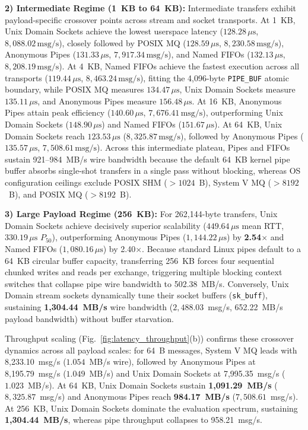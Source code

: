 \textbf{2) Intermediate Regime (1~KB to 64~KB):} Intermediate transfers exhibit payload-specific crossover points across stream and socket transports. At 1~KB, Unix Domain Sockets achieve the lowest userspace latency ($128.28\,\mu\text{s}$, $8,088.02\,\text{msg/s}$), closely followed by POSIX MQ ($128.59\,\mu\text{s}$, $8,230.58\,\text{msg/s}$), Anonymous Pipes ($131.33\,\mu\text{s}$, $7,917.34\,\text{msg/s}$), and Named FIFOs ($132.13\,\mu\text{s}$, $8,208.19\,\text{msg/s}$). At 4~KB, Named FIFOs achieve the fastest execution across all transports ($119.44\,\mu\text{s}$, $8,463.24\,\text{msg/s}$), fitting the 4,096-byte \texttt{PIPE\_BUF} atomic boundary, while POSIX MQ measures $134.47\,\mu\text{s}$, Unix Domain Sockets measure $135.11\,\mu\text{s}$, and Anonymous Pipes measure $156.48\,\mu\text{s}$. At 16~KB, Anonymous Pipes attain peak efficiency ($140.60\,\mu\text{s}$, $7,676.41\,\text{msg/s}$), outperforming Unix Domain Sockets ($148.90\,\mu\text{s}$) and Named FIFOs ($151.67\,\mu\text{s}$). At 64~KB, Unix Domain Sockets reach $123.53\,\mu\text{s}$ ($8,325.87\,\text{msg/s}$), followed by Anonymous Pipes ($135.57\,\mu\text{s}$, $7,508.61\,\text{msg/s}$). Across this intermediate plateau, Pipes and FIFOs sustain 921--984~MB/s wire bandwidth because the default 64~KB kernel pipe buffer absorbs single-shot transfers in a single pass without blocking, whereas OS configuration ceilings exclude POSIX SHM ($>1024$~B), System V MQ ($>8192$~B), and POSIX MQ ($>8192$~B).

\textbf{3) Large Payload Regime (256~KB):} For 262,144-byte transfers, Unix Domain Sockets achieve decisively superior scalability ($449.64\,\mu\text{s}$ mean RTT, $330.19\,\mu\text{s}$ $P_{50}$), outperforming Anonymous Pipes ($1,144.22\,\mu\text{s}$) by \textbf{2.54$\times$} and Named FIFOs ($1,080.16\,\mu\text{s}$) by 2.40$\times$. Because standard Linux pipes default to a 64~KB circular buffer capacity, transferring 256~KB forces four sequential chunked writes and reads per exchange, triggering multiple blocking context switches that collapse pipe wire bandwidth to 502.38~MB/s. Conversely, Unix Domain stream sockets dynamically tune their socket buffers (\texttt{sk\_buff}), sustaining \textbf{1,304.44~MB/s} wire bandwidth ($2,488.03$~msg/s, 652.22~MB/s payload bandwidth) without buffer starvation.

Throughput scaling (Fig.~\ref{fig:latency_throughput}(b)) confirms these crossover dynamics across all payload scales: for 64~B messages, System V MQ leads with 8,233.10~msg/s ($1.054$~MB/s wire), followed by Anonymous Pipes at 8,195.79~msg/s ($1.049$~MB/s) and Unix Domain Sockets at 7,995.35~msg/s ($1.023$~MB/s). At 64~KB, Unix Domain Sockets sustain \textbf{1,091.29~MB/s} ($8,325.87$~msg/s) and Anonymous Pipes reach \textbf{984.17~MB/s} ($7,508.61$~msg/s). At 256~KB, Unix Domain Sockets dominate the evaluation spectrum, sustaining \textbf{1,304.44~MB/s}, whereas pipe throughput collapses to 958.21~msg/s.

